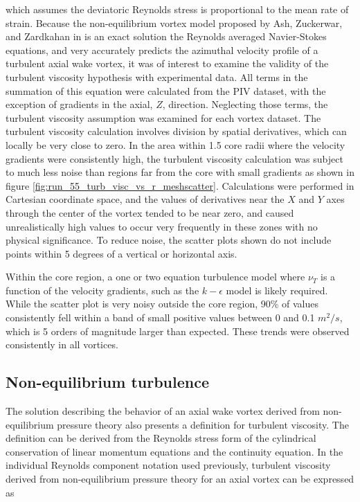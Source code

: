 \noindent
which assumes the deviatoric Reynolds stress is proportional to the mean rate 
of strain. Because the non-equilibrium vortex model proposed by Ash, Zuckerwar, 
and Zardkahan in \cite{ash2011} is an exact solution the Reynolds averaged 
Navier-Stokes equations, and very accurately predicts the azimuthal velocity 
profile of a turbulent axial wake vortex, it was of interest to examine the 
validity of 
the turbulent viscosity hypothesis with experimental data. All terms in the 
summation of this equation were calculated from the PIV dataset, with the 
exception of gradients in the axial, $Z$, direction. Neglecting those terms, 
the turbulent viscosity assumption was examined for each vortex dataset. The 
turbulent viscosity calculation involves division by spatial derivatives, which 
can locally be very close to zero. In the area within 1.5 core radii where the 
velocity gradients were consistently high, the turbulent viscosity calculation 
was subject to much less noise than regions far from the core with small 
gradients as shown in figure \ref{fig:run_55_turb_visc_vs_r_meshscatter}. 
Calculations were performed in Cartesian coordinate space, and the values 
of derivatives near the $X$ and $Y$ axes through the center of the vortex 
tended to be near zero, and caused unrealistically high values to occur very 
frequently in these zones with no physical significance. To reduce noise, the 
scatter plots shown do not include points within 5 degrees of a vertical or 
horizontal axis.

\vspace{32pt}


\noindent
Within the core region, a one or two equation turbulence model where $\nu_T$ is 
a function of the velocity gradients, such as the $k-\epsilon$ model is likely 
required. While the scatter plot is very noisy outside the core region, 
90\% of values consistently fell within a band of small positive values between 
0 and 0.1 $m^2/s$, which is 5 orders of magnitude larger than expected.
These trends were observed consistently in all vortices.

\subsection{Non-equilibrium turbulence}
The solution describing the behavior of an axial wake vortex derived from 
non-equilibrium pressure theory also presents a definition for turbulent 
viscosity. The definition can be derived from the Reynolds stress form of the 
cylindrical conservation of linear momentum equations and the continuity 
equation. In the individual Reynolds component notation used previously, 
turbulent viscosity derived from non-equilibrium pressure theory for an axial 
vortex can be expressed as

